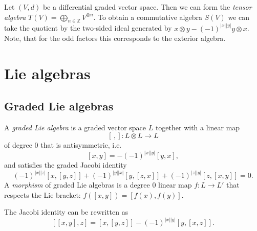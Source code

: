 \documentclass[english,no-theorem-numbers]{short-notes}
\newcommand\degree[1]{|#1|}
\begin{document}
\begin{Ex}
    Let $(V,d)$ be a differential graded vector space.
    Then we can form the \emph{tensor algebra} $T(V) = \bigoplus_{n ∈ ℤ} V^{\otimes n}$.
    To obtain a commutative algebra $S(V)$ we can take the quotient by the two-sided ideal generated by $x \otimes y - (-1)^{\degree x \degree y} y \otimes x$.
    Note, that for the odd factors this corresponds to the exterior algebra.
\end{Ex}

\section{Lie algebras}

\subsection{Graded Lie algebras}

A \emph{graded Lie algebra} is a graded vector space $L$ together with a linear map
\[
[\,,]\colon L \otimes L → L
\]
of degree $0$ that is antisymmetric, i.e.
\[
[x,y] = -(-1)^{\degree x \degree y}[y,x],
\]
and satisfies the graded Jacobi identity
\[
(-1)^{\degree x\degree z} [x,[y,z]] +
(-1)^{\degree y\degree x} [y,[z,x]] +
(-1)^{\degree z\degree y} [z,[x,y]] = 0.
\]
A \emph{morphism} of graded Lie algebras is a degree $0$ linear map $f\colon L → L'$ that respects the Lie bracket: $f([x,y]) = [f(x),f(y)]$.

The Jacobi identity can be rewritten as
\[
[ [x,y],z] = [x,[y,z]] - (-1)^{\degree x \degree y}[y,[x,z]].
\]
\end{document}
